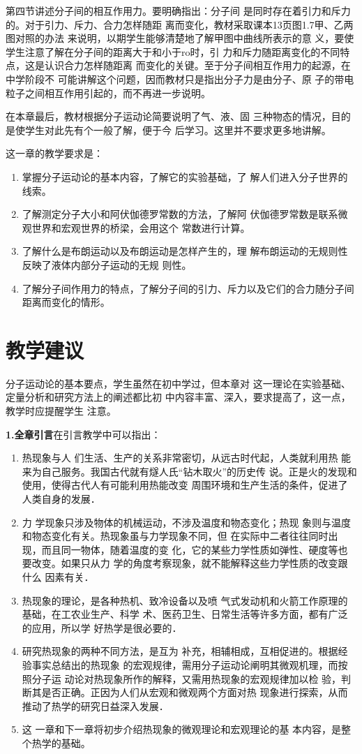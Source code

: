 第四节讲述分子间的相互作用力。要明确指出：分子间
是同时存在着引力和斥力的。对于引力、斥力、合力怎样随距
离而变化，教材采取课本13页图1.7甲、乙两图对照的办法
来说明，以期学生能够清楚地了解甲图中曲线所表示的意
义，要使学生注意了解在分子间的距离大于和小于ro时，引
力和斥力随距离变化的不同特点，这是认识合力怎样随距离
而变化的关键。至于分子间相互作用力的起源，在中学阶段不
可能讲解这个问题，因而教材只是指出分子力是由分子、原
子的带电粒子之间相互作用引起的，而不再进一步说明。

在本章最后，教材根据分子运动论简要说明了气、液、固
三种物态的情况，目的是使学生对此先有个一般了解，便于今
后学习。这里并不要求更多地讲解。

这一章的教学要求是：

\begin{enumerate}
\item 掌握分子运动论的基本内容，了解它的实验基础，了
解人们进入分子世界的线索。
\item 了解测定分子大小和阿伏伽德罗常数的方法，了解阿
伏伽德罗常数是联系微观世界和宏观世界的桥梁，会用这个
常数进行计算。
\item 了解什么是布朗运动以及布朗运动是怎样产生的，理
解布朗运动的无规则性反映了液体内部分子运动的无规
则性。
\item 了解分子间作用力的特点，了解分子间的引力、斥力以及它们的合力随分子间距离而变化的情形。
\end{enumerate}

\section{教学建议}
分子运动论的基本要点，学生虽然在初中学过，但本章对
这一理论在实验基础、定量分析和研究方法上的阐述都比初
中内容丰富、深入，要求提高了，这一点，教学时应提醒学生
注意。

\textbf{1.全章引言}\quad 在引言教学中可以指出：
\begin{enumerate}
    \item 热现象与人
们生活、生产的关系非常密切，从远古时代起，人类就利用热
能来为自己服务。我国古代就有燧人氏“钻木取火”的历史传
说。正是火的发现和使用，使得古代人有可能利用热能改变
周围环境和生产生活的条件，促进了人类自身的发展．
\item 力
学现象只涉及物体的机械运动，不涉及温度和物态变化；热现
象则与温度和物态变化有关。热现象虽与力学现象不同，但
在实际中二者往往同时出现，而且同一物体，随着温度的变
化，它的某些力学性质如弹性、硬度等也要改变。如果只从力
学的角度考察现象，就不能解释这些力学性质的改变跟什么
因素有关．  
\item 热现象的理论，是各种热机、致冷设备以及喷
气式发动机和火箭工作原理的基础，在工农业生产、科学
术、医药卫生、日常生活等许多方面，都有广泛的应用，所以学
好热学是很必要的．  
\item 研究热现象的两种不同方法，是互为
补充，相辅相成，互相促进的。根据经验事实总结出的热现象
的宏观规律，需用分子运动论阐明其微观机理，而按照分子运
动论对热现象所作的解释，又需用热现象的宏观规律加以检
验，判断其是否正确。正因为人们从宏观和微观两个方面对热
现象进行探索，从而推动了热学的研究日益深入发展．
\item 这
一章和下一章将初步介绍热现象的微观理论和宏观理论的基
本内容，是整个热学的基础。
\end{enumerate}

